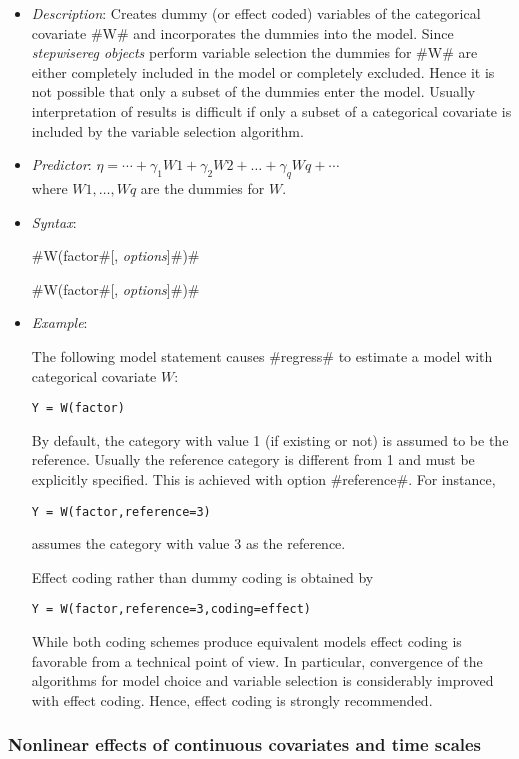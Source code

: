 \begin{itemize}
\item[] {\em Description}: Creates dummy (or effect coded) variables of the categorical covariate #W# and incorporates the dummies into the model.
Since {\em stepwisereg objects} perform variable selection the dummies for #W# are either completely included in the model or completely excluded.
Hence it is not possible that only a subset of the dummies enter the model.
Usually interpretation of results is difficult
if only a subset of a categorical covariate is included by the variable selection algorithm.
\item[] {\em Predictor}: $\eta =  \cdots + \gamma_1 W1 + \gamma_2 W2 + \dots + \gamma_q Wq + \cdots$ \\
where $W1,\dots,Wq$ are the dummies for $W$.
\item[] {\em Syntax}:

#W(factor#[, {\em options}]#)#

#W(factor#[, {\em options}]#)#
\item[] {\em Example}:

The following model statement causes #regress# to estimate a model
with categorical covariate $W$:

\texttt{Y = W(factor)}

By default, the category with value 1 (if existing or not) is assumed to be the reference. Usually
the reference category is different from 1 and must be explicitly specified. This is achieved with option #reference#.
For instance,

\texttt{Y = W(factor,reference=3)}

assumes the category with value 3 as the reference.

Effect coding rather than dummy coding  is obtained by

\texttt{Y = W(factor,reference=3,coding=effect)}

While both coding schemes produce equivalent models effect coding is favorable from a technical point of view. In particular, convergence of the algorithms
for model choice and variable selection is considerably improved with effect coding. Hence, effect coding is strongly recommended.
\end{itemize}



\subsubsection*{Nonlinear effects of continuous covariates and time
scales}

